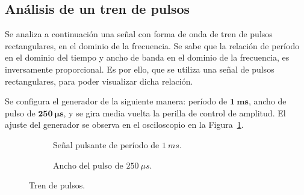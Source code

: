   \subsection{Análisis de un tren de pulsos}

    Se analiza a continuación una señal con forma de onda de tren de pulsos rectangulares, en el dominio 
    de la frecuencia.
    Se sabe que la relación de período en el dominio del tiempo y ancho de banda en el dominio de la frecuencia, 
    es inversamente proporcional. Es por ello, que se utiliza una señal de pulsos rectangulares, para poder visualizar 
    dicha relación.

    Se configura el generador de la siguiente manera: período de $\mathbf{1~ms}$, ancho de pulso de 
    $\mathbf{250~} \boldsymbol{\mu} \mathbf{s}$, y se gira media vuelta la perilla de control de amplitud.
    El ajuste del generador se observa en el osciloscopio en la Figura~\ref{fig:Exp2SeñalPulso}.

      \begin{figure}[H]
        \centering
        \begin{subfigure}[H]{0.48\textwidth}
          \caption{Señal pulsante de período de $1~ms$.}
        \end{subfigure}
        \hfill
        \begin{subfigure}[H]{0.48\textwidth}
          \caption{Ancho del pulso de $250~\mu s$.}
        \end{subfigure}

        \caption{Tren de pulsos.}
        \label{fig:Exp2SeñalPulso}
      \end{figure}

